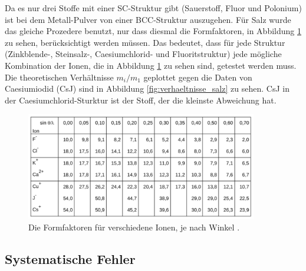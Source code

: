 Da es nur drei Stoffe mit einer SC-Struktur gibt (Sauerstoff, Fluor und Polonium) ist bei dem Metall-Pulver von einer BCC-Struktur auszugehen. Für Salz wurde das gleiche Prozedere benutzt, nur dass diesmal die Formfaktoren, in Abbildung \ref{fig:formfaktoren} zu sehen, berücksichtigt werden müssen. Das bedeutet, dass für jede Struktur (Zinkblende-, Steinsalz-, Caesiumchlorid- und Fluoritstruktur) jede mögliche Kombination der Ionen, die in Abbildung \ref{fig:formfaktoren} zu sehen sind, getestet werden muss. Die theoretischen Verhältnisse $m_i / m_1$ geplottet gegen die Daten von Caesiumiodid (CsJ) sind in Abbildung \ref{fig:verhaeltnisse_salz} zu sehen. CsJ in der Caesiumchlorid-Sturktur ist der Stoff, der die kleinste Abweichung hat. 
\begin{figure}[h]
\centering
	\includegraphics[width = 0.9\textwidth]{Abbildungen/formfaktoren.pdf}
\caption{Die Formfaktoren für verschiedene Ionen, je nach Winkel \cite{Anleitung}.}
\label{fig:formfaktoren}
\end{figure}

\subsection{Systematische Fehler}

